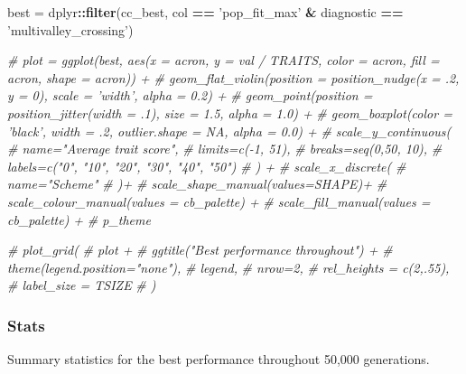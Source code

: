 \documentclass[]{book}
\newenvironment{Shaded}{\begin{snugshade}}{\end{snugshade}}
\newcommand{\CommentTok}[1]{\textcolor[rgb]{0.56,0.35,0.01}{\textit{#1}}}
\newcommand{\KeywordTok}[1]{\textcolor[rgb]{0.13,0.29,0.53}{\textbf{#1}}}
\newcommand{\NormalTok}[1]{#1}
\newcommand{\OperatorTok}[1]{\textcolor[rgb]{0.81,0.36,0.00}{\textbf{#1}}}
\newcommand{\StringTok}[1]{\textcolor[rgb]{0.31,0.60,0.02}{#1}}
\begin{document}
\begin{Shaded}
\begin{Highlighting}[]
\NormalTok{best =}\StringTok{ }\NormalTok{dplyr}\OperatorTok{::}\KeywordTok{filter}\NormalTok{(cc_best, col }\OperatorTok{==}\StringTok{ 'pop_fit_max'} \OperatorTok{&}\StringTok{ }\NormalTok{diagnostic }\OperatorTok{==}\StringTok{ 'multivalley_crossing'}\NormalTok{)}

\CommentTok{# plot = ggplot(best, aes(x = acron, y = val / TRAITS, color = acron, fill = acron, shape = acron)) +}
\CommentTok{#   geom_flat_violin(position = position_nudge(x = .2, y = 0), scale = 'width', alpha = 0.2) +}
\CommentTok{#   geom_point(position = position_jitter(width = .1), size = 1.5, alpha = 1.0) +}
\CommentTok{#   geom_boxplot(color = 'black', width = .2, outlier.shape = NA, alpha = 0.0) +}
\CommentTok{#   scale_y_continuous(}
\CommentTok{#     name="Average trait score",}
\CommentTok{#     limits=c(-1, 51),}
\CommentTok{#     breaks=seq(0,50, 10),}
\CommentTok{#     labels=c("0", "10", "20", "30", "40", "50")}
\CommentTok{#   ) +}
\CommentTok{#   scale_x_discrete(}
\CommentTok{#     name="Scheme"}
\CommentTok{#   )+}
\CommentTok{#   scale_shape_manual(values=SHAPE)+}
\CommentTok{#   scale_colour_manual(values = cb_palette) +}
\CommentTok{#   scale_fill_manual(values = cb_palette) +}
\CommentTok{#   p_theme}

\CommentTok{# plot_grid(}
\CommentTok{#   plot +}
\CommentTok{#     ggtitle("Best performance throughout") +}
\CommentTok{#     theme(legend.position="none"),}
\CommentTok{#   legend,}
\CommentTok{#   nrow=2,}
\CommentTok{#   rel_heights = c(2,.55),}
\CommentTok{#   label_size = TSIZE}
\CommentTok{# )}
\end{Highlighting}
\end{Shaded}

\hypertarget{stats}{%
\subsubsection{Stats}\label{stats}}

Summary statistics for the best performance throughout 50,000 generations.
\end{document}
